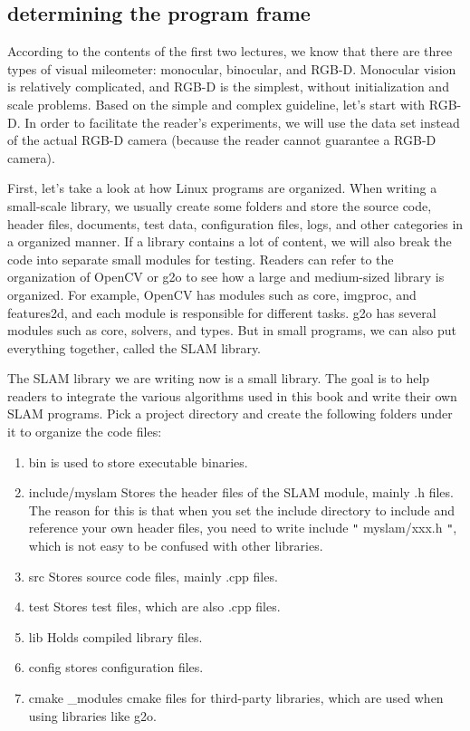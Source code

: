 \subsection{determining the program frame}
According to the contents of the first two lectures, we know that there are three types of visual mileometer: monocular, binocular, and RGB-D. Monocular vision is relatively complicated, and RGB-D is the simplest, without initialization and scale problems. Based on the simple and complex guideline, let's start with RGB-D. In order to facilitate the reader's experiments, we will use the data set instead of the actual RGB-D camera (because the reader cannot guarantee a RGB-D camera).

First, let's take a look at how Linux programs are organized. When writing a small-scale library, we usually create some folders and store the source code, header files, documents, test data, configuration files, logs, and other categories in a organized manner. If a library contains a lot of content, we will also break the code into separate small modules for testing. Readers can refer to the organization of OpenCV or g2o to see how a large and medium-sized library is organized. For example, OpenCV has modules such as core, imgproc, and features2d, and each module is responsible for different tasks. g2o has several modules such as core, solvers, and types. But in small programs, we can also put everything together, called the SLAM library.

The SLAM library we are writing now is a small library. The goal is to help readers to integrate the various algorithms used in this book and write their own SLAM programs. Pick a project directory and create the following folders under it to organize the code files:

\begin{enumerate}
\item bin is used to store executable binaries.
\item include/myslam Stores the header files of the SLAM module, mainly .h files. The reason for this is that when you set the include directory to include and reference your own header files, you need to write include \texttt{"} myslam/xxx.h \texttt{"}, which is not easy to be confused with other libraries.
\item src Stores source code files, mainly .cpp files.
\item test Stores test files, which are also .cpp files.
\item lib Holds compiled library files.
\item config stores configuration files.
\item cmake \_modules cmake files for third-party libraries, which are used when using libraries like g2o.
\end{enumerate}

